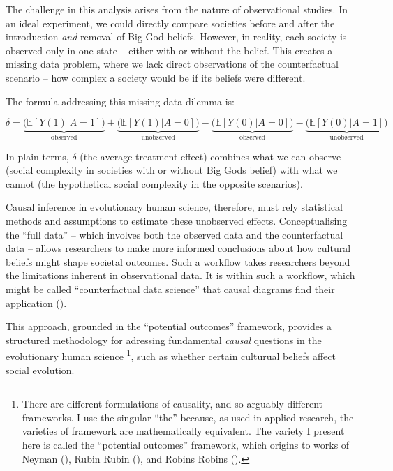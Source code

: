 \documentclass[
  singlecolumn,
  9pt]{article}
\begin{document}
The challenge in this analysis arises from the nature of observational
studies. In an ideal experiment, we could directly compare societies
before and after the introduction \emph{and} removal of Big God beliefs.
However, in reality, each society is observed only in one state --
either with or without the belief. This creates a missing data problem,
where we lack direct observations of the counterfactual scenario -- how
complex a society would be if its beliefs were different.

The formula addressing this missing data dilemma is:

\[
\delta = \underbrace{\big(\mathbb{E}[Y(1)|A = 1]\big)}_{\text{observed}} + \underbrace{\big(\mathbb{E}[Y(1)|A = 0]\big)}_{\text{unobserved}} - \underbrace{\big(\mathbb{E}[Y(0)|A = 0]\big)}_{\text{observed}}  - \underbrace{\big(\mathbb{E}[Y(0)|A = 1]\big)}_{\text{unobserved}}
\]

In plain terms, \(\delta\) (the average treatment effect) combines what
we can observe (social complexity in societies with or without Big Gods
belief) with what we cannot (the hypothetical social complexity in the
opposite scenarios).

Causal inference in evolutionary human science, therefore, must rely
statistical methods and assumptions to estimate these unobserved
effects. Conceptualising the ``full data'' -- which involves both the
observed data and the counterfactual data -- allows researchers to make
more informed conclusions about how cultural beliefs might shape
societal outcomes. Such a workflow takes researchers beyond the
limitations inherent in observational data. It is within such a
workflow, which might be called ``counterfactual data science'' that
causal diagrams find their application
().

This approach, grounded in the ``potential outcomes'' framework,
provides a structured methodology for adressing fundamental
\emph{causal} questions in the evolutionary human science \footnote{There
  are different formulations of causality, and so arguably different
  frameworks. I use the singular ``the'' because, as used in applied
  research, the varieties of framework are mathematically equivalent.
  The variety I present here is called the ``potential outcomes''
  framework, which origins to works of Neyman
  (), Rubin Rubin
  (), and Robins Robins
  ().}, such as whether certain culturual
beliefs affect social evolution.
\end{document}
